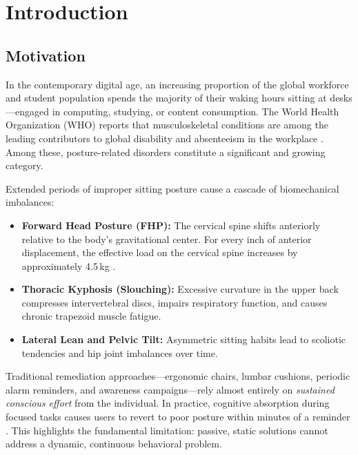 \documentclass[12pt,a4paper]{report}
\begin{document}
\clearpage

\tableofcontents
\clearpage

\listoffigures
\listoftables
\clearpage

\chapter{Introduction}

\section{Motivation}

In the contemporary digital age, an increasing proportion of the global workforce and student population spends the majority of their waking hours sitting at desks—engaged in computing, studying, or content consumption. The World Health Organization (WHO) reports that musculoskeletal conditions are among the leading contributors to global disability and absenteeism in the workplace \cite{who2021}. Among these, posture-related disorders constitute a significant and growing category.

Extended periods of improper sitting posture cause a cascade of biomechanical imbalances:

\begin{itemize}[leftmargin=2em]
    \item \textbf{Forward Head Posture (FHP):} The cervical spine shifts anteriorly relative to the body's gravitational center. For every inch of anterior displacement, the effective load on the cervical spine increases by approximately 4.5\,kg \cite{hansraj2014}.
    \item \textbf{Thoracic Kyphosis (Slouching):} Excessive curvature in the upper back compresses intervertebral discs, impairs respiratory function, and causes chronic trapezoid muscle fatigue.
    \item \textbf{Lateral Lean and Pelvic Tilt:} Asymmetric sitting habits lead to scoliotic tendencies and hip joint imbalances over time.
\end{itemize}

Traditional remediation approaches—ergonomic chairs, lumbar cushions, periodic alarm reminders, and awareness campaigns—rely almost entirely on \textit{sustained conscious effort} from the individual. In practice, cognitive absorption during focused tasks causes users to revert to poor posture within minutes of a reminder \cite{claus2016}. This highlights the fundamental limitation: passive, static solutions cannot address a dynamic, continuous behavioral problem.
\end{document}
